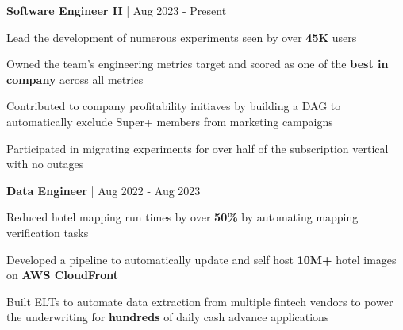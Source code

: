 


\begin{cventries}

\cventry
{\textbf{Software Engineer II} | \color{awesome}{Super}}
{Aug 2023 - Present} %
{ %
\begin{cvitems}
\item {Lead the development of numerous experiments seen by over \textbf{45K} users}
\item {Owned the team's engineering metrics target and scored as one of the \textbf{best in company} across all metrics}
\item {Contributed to company profitability initiaves by building a DAG to automatically exclude Super+ members from marketing campaigns}
\item {Participated in migrating experiments for over half of the subscription vertical with no outages}
\end{cvitems}
}

\cventry
{\textbf{Data Engineer} | \color{awesome}{Super}}
{Aug 2022 - Aug 2023} %
{ %
\begin{cvitems}
\item {Reduced hotel mapping run times by over \textbf{50\%} by automating mapping verification tasks}
\item {Developed a pipeline to automatically update and self host \textbf{10M+} hotel images on \textbf{AWS CloudFront}}
\item {Built ELTs to automate data extraction from multiple fintech vendors to power the underwriting for \textbf{hundreds} of daily cash advance applications}
\end{cvitems}
}



\end{cventries}
